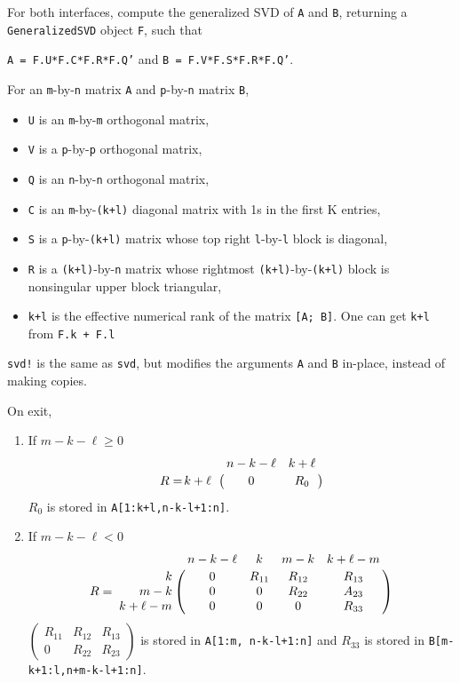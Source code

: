 For both interfaces, compute the generalized SVD of \texttt{A} and \texttt{B},
returning a \texttt{GeneralizedSVD} object \texttt{F}, 
such that 
\begin{center} 
\texttt{A = F.U*F.C*F.R*F.Q'} 
\quad and \quad 
\texttt{B = F.V*F.S*F.R*F.Q'}. 
\end{center} 
For an \texttt{m}-by-\texttt{n} matrix \texttt{A} and \texttt{p}-by-\texttt{n} matrix \texttt{B},
\begin{itemize}
\item \texttt{U} is an \texttt{m}-by-\texttt{m} orthogonal matrix,
\item \texttt{V} is a \texttt{p}-by-\texttt{p} orthogonal matrix,
\item \texttt{Q} is an \texttt{n}-by-\texttt{n} orthogonal matrix,
\item \texttt{C} is an \texttt{m}-by-\texttt{(k+l)} diagonal matrix with 1s in the first K entries,
\item \texttt{S} is a \texttt{p}-by-\texttt{(k+l)} matrix whose top right \texttt{l}-by-\texttt{l} block is diagonal,
\item \texttt{R} is a \texttt{(k+l)}-by-\texttt{n} matrix whose rightmost \texttt{(k+l)}-by-\texttt{(k+l)} block is nonsingular upper block triangular,
\item \texttt{k+l} is the effective numerical 
rank of the matrix \texttt{[A; B]}. One can get {\tt k+l}
from {\tt F.k + F.l} 
\end{itemize}

\texttt{svd!} is the same as \texttt{svd}, but modifies the 
arguments \texttt{A} and \texttt{B} in-place, instead of making copies. 

On exit,
\begin{enumerate}
	\item If $m-k-\ell \geq 0$
		\begin{equation*}
			R = \bordermatrix{ 
               & n-k-\ell & k + \ell \cr
    			\hfill k+\ell & 0 & R_{0} \cr}
		\end{equation*}
		$R_{0}$ is stored in \texttt{A[1:k+l,n-k-l+1:n]}.
	\item If $m-k-\ell <0$
		\begin{equation*}
			R = \bordermatrix{ 
               & n-k-\ell & k & m-k & k+\ell-m \cr
               \hfill k & 0 & R_{11} & R_{12} & R_{13} \cr
    			\hfill m-k & 0 & 0 & R_{22} & A_{23} \cr
    			\hfill k+\ell-m & 0 & 0 & 0 & R_{33} \cr}
		\end{equation*}
		$\begin{pmatrix}
			R_{11} & R_{12} & R_{13} \\
			0 & R_{22} & R_{23}
		\end{pmatrix}$
		is stored in \texttt{A[1:m, n-k-l+1:n]} and $R_{33}$ is stored in 
		\texttt{B[m-k+1:l,n+m-k-l+1:n]}.
\end{enumerate}


